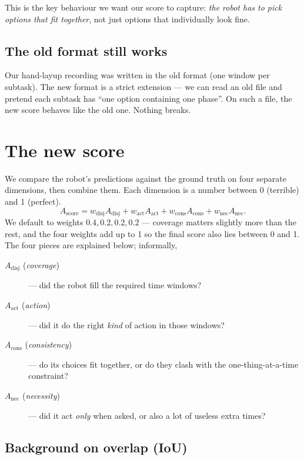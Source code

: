 \documentclass[11pt]{article}
\newcommand{\Score}{A_{\text{score}}}
\newcommand{\Adisj}{A_{\text{disj}}}
\newcommand{\Aact}{A_{\text{act}}}
\newcommand{\Acons}{A_{\text{cons}}}
\newcommand{\Anec}{A_{\text{nec}}}
\begin{document}
This is the key behaviour we want our score to capture: \emph{the
robot has to pick options that fit together}, not just options that
individually look fine.

\subsection{The old format still works}

Our hand-layup recording was written in the old format (one window per
subtask). The new format is a strict extension --- we can read an old
file and pretend each subtask has ``one option containing one phase''.
On such a file, the new score behaves like the old one. Nothing breaks.

\section{The new score}
\label{sec:metric}

We compare the robot's predictions against the ground truth on four
separate dimensions, then combine them. Each dimension is a number
between 0 (terrible) and 1 (perfect).
\begin{equation}
  \Score
  = w_{\text{disj}}\Adisj
  + w_{\text{act}}\Aact
  + w_{\text{cons}}\Acons
  + w_{\text{nec}}\Anec.
  \label{eq:composite}
\end{equation}
We default to weights $0.4, 0.2, 0.2, 0.2$ --- coverage matters
slightly more than the rest, and the four weights add up to 1 so the
final score also lies between 0 and 1. The four pieces are explained
below; informally,
\begin{description}
  \item[$\Adisj$ (\emph{coverage})] --- did the robot fill the
    required time windows?
  \item[$\Aact$ (\emph{action})] --- did it do the right \emph{kind}
    of action in those windows?
  \item[$\Acons$ (\emph{consistency})] --- do its choices fit
    together, or do they clash with the one-thing-at-a-time
    constraint?
  \item[$\Anec$ (\emph{necessity})] --- did it act \emph{only} when
    asked, or also a lot of useless extra times?
\end{description}

\subsection{Background on overlap (IoU)}
\end{document}
